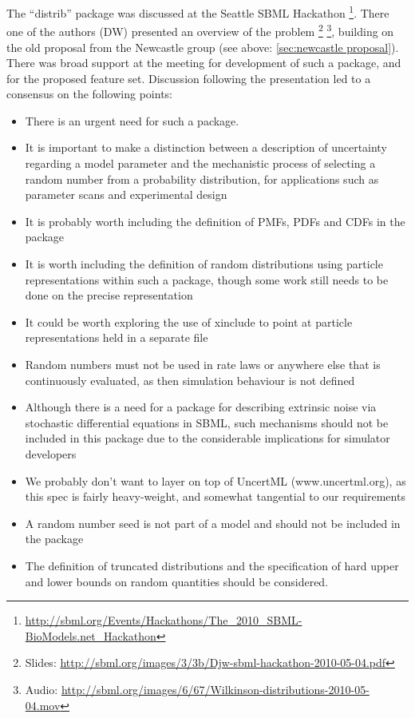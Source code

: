 \documentclass[draftspec]{sbmlpkgspec}
\begin{document}
The ``distrib'' package was discussed at the Seattle SBML Hackathon%
\footnote{\url{http://sbml.org/Events/Hackathons/The_2010_SBML-BioModels.net_Hackathon}}. There
one of the authors (DW) presented an overview of the problem%
\footnote{Slides:
 \url{http://sbml.org/images/3/3b/Djw-sbml-hackathon-2010-05-04.pdf}}%
\footnote{Audio:
  \url{http://sbml.org/images/6/67/Wilkinson-distributions-2010-05-04.mov}},
building on the old proposal from the Newcastle group
 (see above: \ref{sec:newcastle proposal}).
There was broad support at the meeting for development of such a
package, and for the proposed feature set. Discussion following the
presentation led to a consensus on the following points:

\begin{itemize}
\item There is an urgent need for such a package.
\item It is important to make a distinction between a description of
  uncertainty regarding a model parameter and the mechanistic process
  of selecting a random number from a probability distribution, for
  applications such as parameter scans and experimental design
\item It is probably worth including the definition of PMFs, PDFs and CDFs in the package
\item It is worth including the definition of random distributions using particle representations within such a package, though some work
 still needs to be done on the precise representation
\item It could be worth exploring the use of xinclude to point at particle
representations held in a separate file
\item Random numbers must not be used in rate laws or anywhere else that
 is continuously evaluated, as then simulation behaviour is not
 defined
\item Although there is a need for a package for describing extrinsic
 noise via stochastic differential equations in SBML, such mechanisms
 should not be included in this package due to the considerable
 implications for simulator developers
\item We probably don't want to layer on top of UncertML
 (www.uncertml.org), as this spec is fairly heavy-weight, and
 somewhat tangential to our requirements
\item A random number seed is not part of a model and should not be
 included in the package
\item The definition of truncated distributions and the specification of
 hard upper and lower bounds on random quantities should be
 considered.
\end{itemize}
\end{document}
